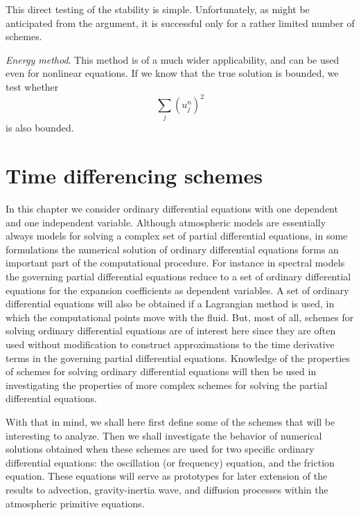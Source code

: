 This direct testing of the stability is simple. Unfortunately, as might be anticipated from the argument, it is successful only for a rather limited number of schemes.

\textit{Energy method}. This method is of a much wider applicability, and can be used even for nonlinear equations. If we know that the true solution is bounded, we test whether
$$\displaystyle\sum_j(u_j^n)^2$$
is also bounded.


\section{Time differencing schemes}
In this chapter we consider ordinary differential equations with one dependent and one independent variable. Although atmospheric models are essentially always models for solving a complex set of partial differential equations, in some formulations the numerical solution of ordinary differential equations forms an important part of the computational procedure. For instance in spectral models the governing partial differential equations reduce to a set of ordinary differential equations for the expansion coefficients as dependent variables. A set of ordinary differential equations will also be obtained if a Lagrangian method is used, in which the computational points move with the fluid. But, most of all, schemes for solving ordinary differential equations are of interest here since they are often used without modification to construct approximations to the time derivative terms in the governing partial differential equations. Knowledge of the properties of schemes for solving ordinary differential equations will then be used in investigating the properties of more complex schemes for solving the partial differential equations.

With that in mind, we shall here first define some of the schemes that will be interesting to analyze. Then we shall investigate the behavior of numerical solutions obtained when these schemes are used for two specific ordinary differential equations: the oscillation (or frequency) equation, and the friction equation. These equations will serve as prototypes for later extension of the results to advection, gravity-inertia wave, and diffusion processes within the atmospheric primitive equations.

